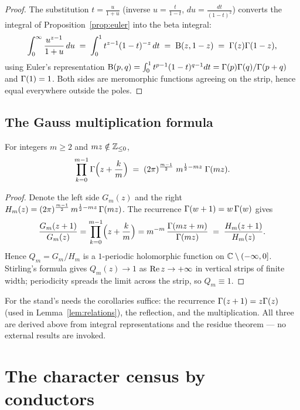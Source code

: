 \begin{proof}
The substitution $t=\frac{u}{1+u}$ (inverse $u=\frac{t}{1-t}$,
$du=\frac{dt}{(1-t)^2}$) converts the integral of
Proposition~\ref{prop:euler} into the beta integral:
\[
  \int_0^\infty\frac{u^{z-1}}{1+u}\,du
  \;=\;\int_0^1 t^{z-1}(1-t)^{-z}\,dt
  \;=\;\mathrm{B}(z,1-z)
  \;=\;\Gamma(z)\Gamma(1-z),
\]
using Euler's representation
$\mathrm{B}(p,q)=\int_0^1t^{p-1}(1-t)^{q-1}dt=\Gamma(p)\Gamma(q)/\Gamma(p+q)$ and
$\Gamma(1)=1$. Both sides are meromorphic functions agreeing on the
strip, hence equal everywhere outside the poles.
\end{proof}

\subsection{The Gauss multiplication formula}

\begin{proposition}\label{prop:mult}
For integers $m\ge2$ and $mz\notin\mathbb{Z}_{\le0}$,
\[
  \prod_{k=0}^{m-1}\Gamma\Bigl(z+\frac{k}{m}\Bigr)
  \;=\;(2\pi)^{\frac{m-1}{2}}\;m^{\frac12-mz}\;\Gamma(mz).
\]
\end{proposition}

\begin{proof}
Denote the left side $G_m(z)$ and the right
$H_m(z)=(2\pi)^{\frac{m-1}{2}}\,m^{\frac12-mz}\,\Gamma(mz)$. The
recurrence $\Gamma(w+1)=w\,\Gamma(w)$ gives
\[
  \frac{G_m(z+1)}{G_m(z)}
  =\prod_{k=0}^{m-1}\Bigl(z+\frac{k}{m}\Bigr)
  =m^{-m}\,\frac{\Gamma(mz+m)}{\Gamma(mz)}
  \;=\;\frac{H_m(z+1)}{H_m(z)}.
\]
Hence $Q_m=G_m/H_m$ is a $1$-periodic holomorphic function on
$\mathbb{C}\setminus(-\infty,0]$. Stirling's formula gives $Q_m(z)\to1$ as
$\operatorname{Re} z\to+\infty$ in vertical strips of finite width; periodicity
spreads the limit across the strip, so $Q_m\equiv1$.
\end{proof}

\begin{remark}
For the stand's needs the corollaries suffice: the recurrence
$\Gamma(z+1)=z\Gamma(z)$ (used in Lemma~\ref{lem:relations}), the
reflection, and the multiplication. All three are derived above from
integral representations and the residue theorem --- no external
results are invoked.
\end{remark}

\section{The character census by conductors}\label{app:census}

